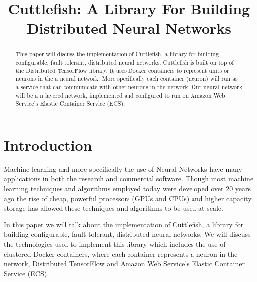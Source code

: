 \documentclass[conference]{IEEEtran}
\begin{document}
\title{Cuttlefish: A Library For Building Distributed Neural Networks}

\author{
}
\maketitle

\maketitle

\begin{abstract}
This paper will discuss the implementation of Cuttlefish, a library for building configurable, fault tolerant, distributed neural networks. Cuttlefish is built on top of the Distributed TensorFlow library. It uses Docker containers to represent units or neurons in the a neural network. More specifically each container (neuron) will run as a service that can communicate with other neurons in the network. Our neural network will be a n layered network, implemented and configured to run on Amazon Web Service's Elastic Container Service (ECS).
\end{abstract}

\IEEEpeerreviewmaketitle



\section{Introduction}
Machine learning and more specifically the use of Neural Networks have many applications in both the research and commercial software. Though most machine learning techniques and algorithms employed today were developed over 20 years ago the rise of cheap, powerful processors (GPUs and CPUs) and higher capacity storage has allowed these techniques and algorithms to be used at scale.

In this paper we will talk about the implementation of Cuttlefish, a library for building configurable, fault tolerant, distributed neural networks. We will discuss the technologies used to implement this library which includes the use of clustered Docker containers, where each container represents a neuron in the network, Distributed TensorFlow and Amazon Web Service's Elastic Container Service (ECS).
\end{document}
